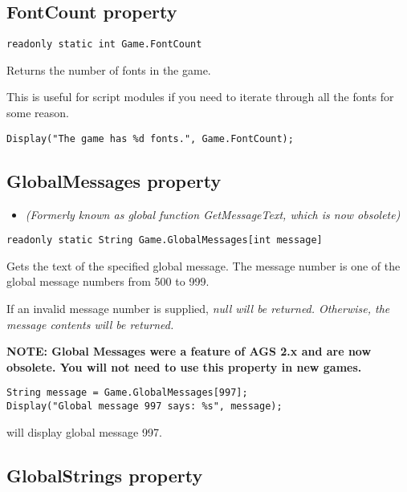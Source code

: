 \subsection{FontCount property}\label{Game.FontCount}%

\begin{verbatim}
readonly static int Game.FontCount
\end{verbatim}
Returns the number of fonts in the game.

This is useful for script modules if you need to iterate through all the fonts for some reason.

\begin{verbatim}
Display("The game has %d fonts.", Game.FontCount);
\end{verbatim}


\subsection{GlobalMessages property}\label{Game.GlobalMessages}%

\begin{itemize}
\item \it{(Formerly known as global function GetMessageText, which is now obsolete)}
\end{itemize}

\begin{verbatim}
readonly static String Game.GlobalMessages[int message]
\end{verbatim}
Gets the text of the specified global message. The message number is one of the global
message numbers from 500 to 999.

If an invalid message number is supplied, \it{null} will be returned. Otherwise, the
message contents will be returned.

\bf{NOTE:} Global Messages were a feature of AGS 2.x and are now obsolete. You will not
need to use this property in new games.

\begin{verbatim}
String message = Game.GlobalMessages[997];
Display("Global message 997 says: %s", message);
\end{verbatim}
will display global message 997.


\subsection{GlobalStrings property}\label{Game.GlobalStrings}%

